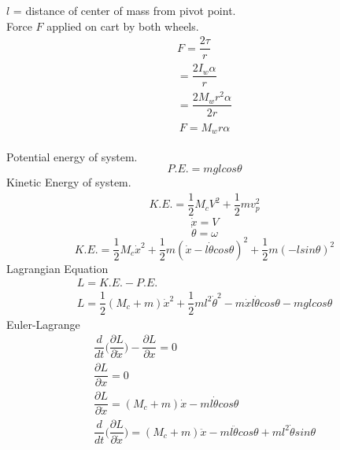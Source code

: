 \documentclass[a4paper,12pt]{article}
\begin{document}
\hspace*{15mm}$l$ = distance of center of mass from pivot point.\\
Force $F$ applied on cart by both wheels.
\begin{equation*}
\begin{gathered}
F = \dfrac{2\tau}{r}\\
  = \dfrac{2I_w\alpha}{r}\\
  = \dfrac{2M_wr^2\alpha}{2r}\\
\end{gathered}
\end{equation*}
\begin{equation}
F = M_wr\alpha
\end{equation}
\\
Potential energy of system.
\begin{equation}
P.E. = mglcos\theta
\end{equation}
Kinetic Energy of system.
\begin{equation*}
\begin{gathered}
K.E. = \dfrac{1}{2}M_cV^2 + \dfrac{1}{2}mv_p^2
\end{gathered}
\end{equation*}
\begin{equation}
\dot{x}=V
\end{equation}
\begin{equation}
\dot{\theta}=\omega
\end{equation}
\begin{equation}
K.E. = \dfrac{1}{2}M_c\dot{x}^2 + \dfrac{1}{2}m(\dot{x}-l\dot{\theta}cos\theta)^2 + \dfrac{1}{2}m(-lsin\theta)^2
\end{equation}
Lagrangian Equation
\begin{equation}
\begin{gathered}
L = K.E. - P.E.
\\
L = \dfrac{1}{2}(M_c+m)\dot{x}^2 + \dfrac{1}{2}ml^2\dot{\theta}^2 - m\dot{x}l\dot{\theta}cos\theta - mglcos\theta
\end{gathered}
\end{equation}
Euler-Lagrange
\begin{equation*}
\begin{gathered}
\dfrac{d}{dt}\Bigg(\dfrac{\partial{L}}{\partial{\dot{x}}}\Bigg) - \dfrac{\partial{L}}{\partial{x}}= 0
\\
\dfrac{\partial{L}}{\partial{x}} = 0
\\
\dfrac{\partial{L}}{\partial{\dot{x}}} = (M_c+m)\dot{x} - ml\dot{\theta}cos\theta
\\
\dfrac{d}{dt}\Bigg(\dfrac{\partial{L}}{\partial{\dot{x}}}\Bigg) = (M_c+m)\ddot{x} - ml\ddot{\theta}cos\theta + ml^2\dot{\theta}sin\theta
\end{gathered}
\end{equation*}
\end{document}
